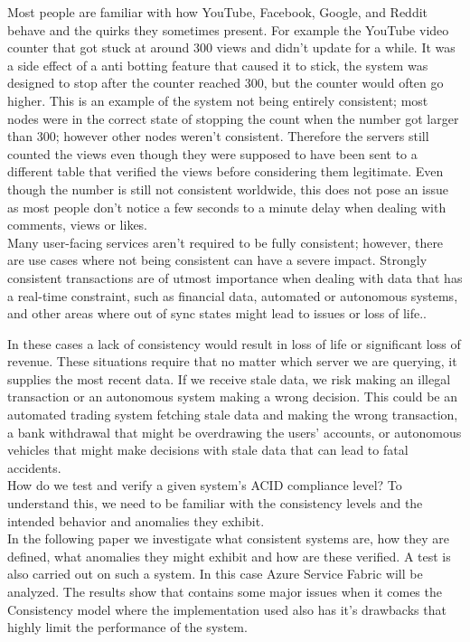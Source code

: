\documentclass[a4paper,10pt,titlepage]{report}
\begin{document}
    Most people are familiar with how YouTube, Facebook, Google, and Reddit behave and the quirks they sometimes present.
    For example the YouTube video counter that got stuck at around 300 views and didn't update for a while. It was a side effect of a anti botting feature that caused it to stick, the system was designed to stop after the counter reached 300, but the counter would often go higher. This is an example of the system not being entirely consistent; most nodes were in the correct state of stopping the count when the number got larger than 300; however other nodes weren't consistent. Therefore the servers still counted the views even though they were supposed to have been sent to a different table that verified the views before considering them legitimate. Even though the number is still not consistent worldwide, this does not pose an issue as most people don't notice a few seconds to a minute delay when dealing with comments, views or likes.
    \\
    Many user-facing services aren't required to be fully consistent; however, there are use cases where not being consistent can have a severe impact. Strongly consistent transactions are of utmost importance when dealing with data that has a real-time constraint, such as financial data, automated or autonomous systems, and other areas where out of sync states might lead to issues or loss of life..

    In these cases a lack of consistency would result in loss of life or significant loss of revenue. These situations require that no matter which server we are querying, it supplies the most recent data. If we receive stale data, we risk making an illegal transaction or an autonomous system making a wrong decision. This could be an automated trading system fetching stale data and making the wrong transaction, a bank withdrawal that might be overdrawing the users' accounts, or autonomous vehicles that might make decisions with stale data that can lead to fatal accidents. \\

    \vspace{5mm}
    How do we test and verify a given system's ACID compliance level? To understand this, we need to be familiar with the consistency levels and the intended behavior and anomalies they exhibit.\\
    
    In the following paper we investigate what consistent systems are, how they are defined, what anomalies they might exhibit and how are these verified. A test is also carried out on such a system. In this case Azure Service Fabric will be analyzed. The results show that contains some major issues when it comes the Consistency model where the implementation used also has it's drawbacks that highly limit the performance of the system.
    
\end{document}
